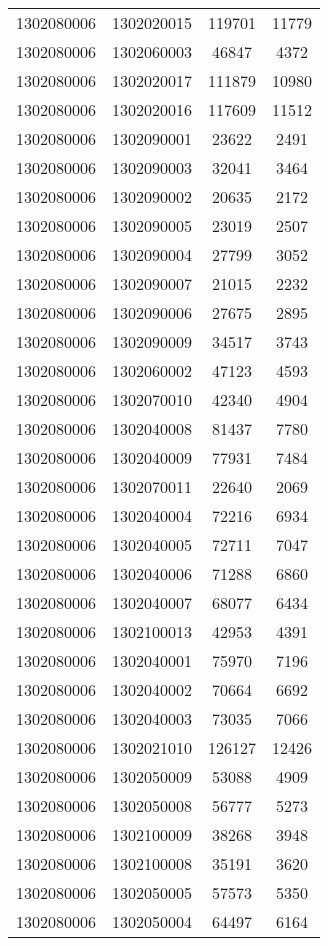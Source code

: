 \begin{longtable}{llcc}
1302080006 & 1302020015 & 119701 & 11779\\
1302080006 & 1302060003 & 46847 & 4372\\
1302080006 & 1302020017 & 111879 & 10980\\
1302080006 & 1302020016 & 117609 & 11512\\
1302080006 & 1302090001 & 23622 & 2491\\
1302080006 & 1302090003 & 32041 & 3464\\
1302080006 & 1302090002 & 20635 & 2172\\
1302080006 & 1302090005 & 23019 & 2507\\
1302080006 & 1302090004 & 27799 & 3052\\
1302080006 & 1302090007 & 21015 & 2232\\
1302080006 & 1302090006 & 27675 & 2895\\
1302080006 & 1302090009 & 34517 & 3743\\
1302080006 & 1302060002 & 47123 & 4593\\
1302080006 & 1302070010 & 42340 & 4904\\
1302080006 & 1302040008 & 81437 & 7780\\
1302080006 & 1302040009 & 77931 & 7484\\
1302080006 & 1302070011 & 22640 & 2069\\
1302080006 & 1302040004 & 72216 & 6934\\
1302080006 & 1302040005 & 72711 & 7047\\
1302080006 & 1302040006 & 71288 & 6860\\
1302080006 & 1302040007 & 68077 & 6434\\
1302080006 & 1302100013 & 42953 & 4391\\
1302080006 & 1302040001 & 75970 & 7196\\
1302080006 & 1302040002 & 70664 & 6692\\
1302080006 & 1302040003 & 73035 & 7066\\
1302080006 & 1302021010 & 126127 & 12426\\
1302080006 & 1302050009 & 53088 & 4909\\
1302080006 & 1302050008 & 56777 & 5273\\
1302080006 & 1302100009 & 38268 & 3948\\
1302080006 & 1302100008 & 35191 & 3620\\
1302080006 & 1302050005 & 57573 & 5350\\
1302080006 & 1302050004 & 64497 & 6164\\

\end{longtable}
